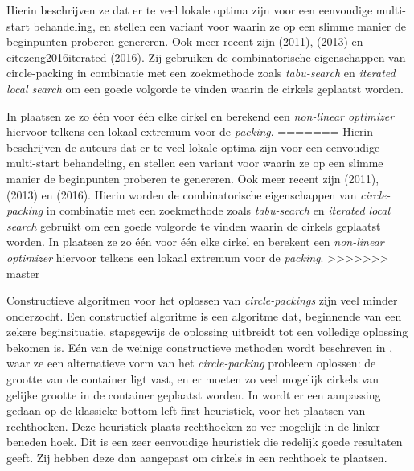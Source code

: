 \documentclass[12pt,a4paper,oneside]{book}
\begin{document}
Hierin beschrijven ze dat er te veel lokale optima zijn voor een eenvoudige multi-start behandeling, en stellen een variant voor waarin ze op een slimme manier de beginpunten proberen genereren.
Ook meer recent zijn \cite{jors2011} (2011), \cite{ye2013iterated} (2013) en cite{zeng2016iterated} (2016).
Zij gebruiken de combinatorische eigenschappen van circle-packing in combinatie met een zoekmethode zoals \textit{tabu-search} en \textit{iterated local search} om een goede volgorde te vinden waarin de cirkels geplaatst worden.

In \cite{jors2011} plaatsen ze zo één voor één elke cirkel en berekend een \textit{non-linear optimizer} hiervoor telkens een lokaal extremum voor de \textit{packing}.
=======
Hierin beschrijven de auteurs dat er te veel lokale optima zijn voor een eenvoudige multi-start behandeling, en stellen een variant voor waarin ze op een slimme manier de beginpunten proberen te genereren.
Ook meer recent zijn \cite{jors2011} (2011), \cite{ye2013iterated} (2013) en \cite{zeng2016iterated} (2016).
Hierin worden de combinatorische eigenschappen van \textit{circle-packing} in combinatie met een zoekmethode zoals \textit{tabu-search} en \textit{iterated local search} gebruikt om een goede volgorde te vinden waarin de cirkels geplaatst worden.
In \cite{jors2011} plaatsen ze zo één voor één elke cirkel en berekent een \textit{non-linear optimizer} hiervoor telkens een lokaal extremum voor de \textit{packing}.
>>>>>>> master

Constructieve algoritmen voor het oplossen van \textit{circle-packings} zijn veel minder onderzocht.
Een constructief algoritme is een algoritme dat, beginnende van een zekere beginsituatie, stapsgewijs de oplossing uitbreidt tot een volledige oplossing bekomen is.
Eén van de weinige constructieve methoden wordt beschreven in \cite{akeb2006basic}, waar ze een alternatieve vorm van het \textit{circle-packing} probleem oplossen: de grootte van de container ligt vast, en er moeten zo veel mogelijk cirkels van gelijke grootte in de container geplaatst worden.
In \cite{hifi2004approximate} wordt er een aanpassing gedaan op de klassieke bottom-left-first heuristiek, voor het plaatsen van rechthoeken.
Deze heuristiek plaats rechthoeken zo ver mogelijk in de linker beneden hoek.
Dit is een zeer eenvoudige heuristiek die redelijk goede resultaten geeft.
Zij hebben deze dan aangepast om cirkels in een rechthoek te plaatsen.
\end{document}

